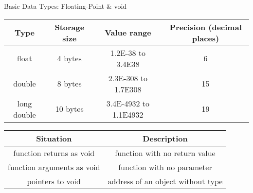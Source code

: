 \documentclass[10pt,t]{beamer}
\begin{document}
\begin{frame}{Basic Data Types: Floating-Point \& void}
  \begin{center}
    \begin{tabular}{|c|c|c|c|}
      \hline
      Type & Storage size & Value range & Precision (decimal places) \\
      \hline
      float       & 4 bytes  & 1.2E-38 to 3.4E38     & 6 \\
      double      & 8 bytes  & 2.3E-308 to 1.7E308   & 15 \\
      long double & 10 bytes & 3.4E-4932 to 1.1E4932 & 19 \\
      \hline
    \end{tabular}
  \end{center}

  \begin{center}
    \begin{tabular}{|c|c|}
      \hline
      Situation & Description \\
      \hline
      function returns as void & function with no return value \\
      function arguments as void & function with no parameter \\
      pointers to void & address of an object without type \\
      \hline
    \end{tabular}
  \end{center}
\end{frame}
\end{document}
